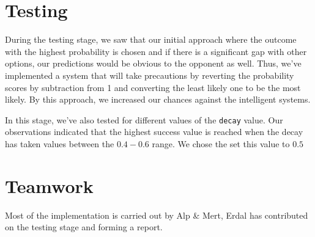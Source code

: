 \documentclass{IEEEtran}
\begin{document}
	
	\section{Testing}
		During the testing stage, we saw that our initial approach where the outcome with the highest probability is chosen and if there is a significant gap with other options, our predictions would be obvious to the opponent as well. Thus, we've implemented a system that will take precautions by reverting the probability scores by subtraction from 1 and converting the least likely one to be the most likely. By this approach, we increased our chances against the intelligent systems.
		
		In this stage, we've also tested for different values of the \texttt{decay} value. Our observations indicated that the highest success value is reached when the decay has taken values between the $0.4-0.6$ range. We chose the set this value to $0.5$
		
	\section{Teamwork}
	
	Most of the implementation is carried out by Alp \& Mert, Erdal has contributed on the testing stage and forming a report. 

	
	
	
\end{document}
